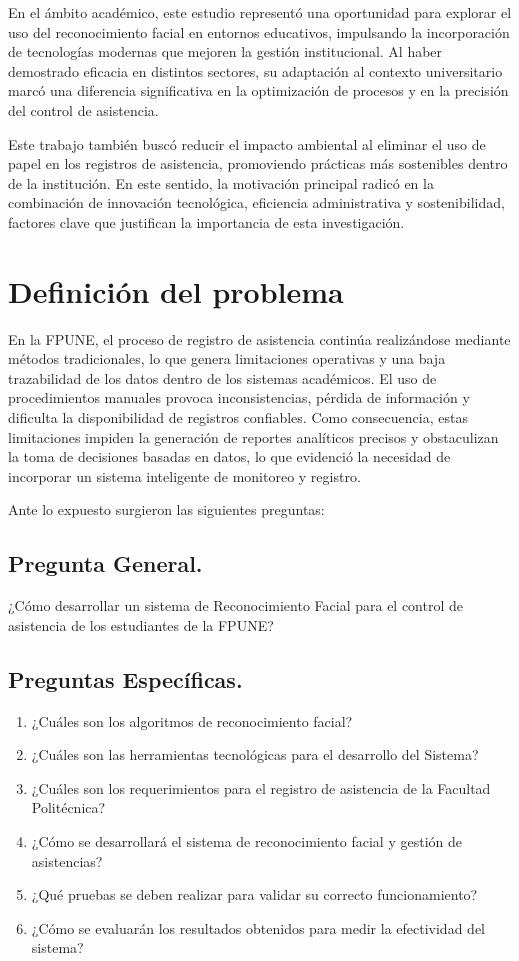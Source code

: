 En el ámbito académico, este estudio representó una oportunidad para explorar el uso del reconocimiento facial en entornos educativos, impulsando la incorporación de tecnologías modernas que mejoren la gestión institucional. Al haber demostrado eficacia en distintos sectores, su adaptación al contexto universitario marcó una diferencia significativa en la optimización de procesos y en la precisión del control de asistencia.

Este trabajo también buscó reducir el impacto ambiental al eliminar el uso de papel en los registros de asistencia, promoviendo prácticas más sostenibles dentro de la institución. En este sentido, la motivación principal radicó en la combinación de innovación tecnológica, eficiencia administrativa y sostenibilidad, factores clave que justifican la importancia de esta investigación.

\section{Definición del problema}

En la FPUNE, el proceso de registro de asistencia continúa realizándose mediante métodos tradicionales, lo que genera limitaciones operativas y una baja trazabilidad de los datos dentro de los sistemas académicos. El uso de procedimientos manuales provoca inconsistencias, pérdida de información y dificulta la disponibilidad de registros confiables. Como consecuencia, estas limitaciones impiden la generación de reportes analíticos precisos y obstaculizan la toma de decisiones basadas en datos, lo que evidenció la necesidad de incorporar un sistema inteligente de monitoreo y registro.

Ante lo expuesto surgieron las siguientes preguntas:

\subsection*{Pregunta General.}
¿Cómo desarrollar un sistema de Reconocimiento Facial para el control de asistencia de los estudiantes de la FPUNE?

\subsection*{Preguntas Específicas.}
\begin{enumerate}
    \item ¿Cuáles son los algoritmos de reconocimiento facial?
    \item ¿Cuáles son las herramientas tecnológicas para el desarrollo del Sistema?
    \item ¿Cuáles son los requerimientos para el registro de asistencia de la Facultad Politécnica?
    \item ¿Cómo se desarrollará el sistema de reconocimiento facial y gestión de asistencias?
    \item ¿Qué pruebas se deben realizar para validar su correcto funcionamiento?
    \item ¿Cómo se evaluarán los resultados obtenidos para medir la efectividad del sistema?
\end{enumerate}




